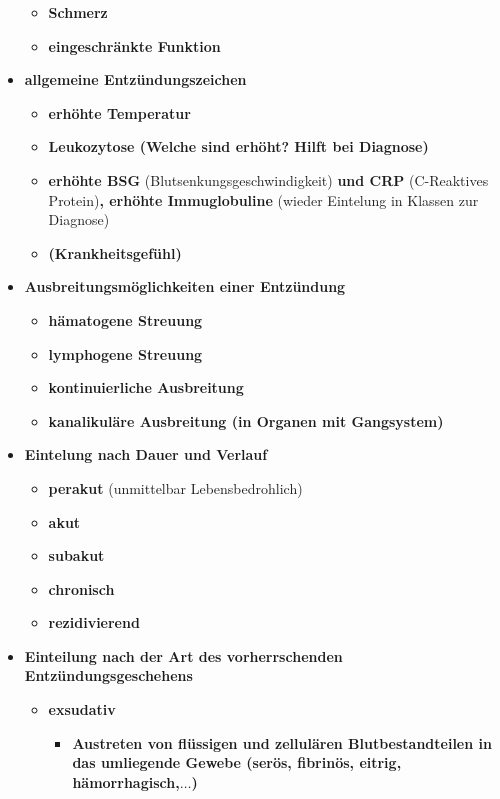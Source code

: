 \begin{itemize}
\begin{itemize}
				\item \textbf{Schmerz}
				\item \textbf{eingeschränkte Funktion}
			\end{itemize}
\pagebreak
		\item \textbf{allgemeine Entzündungszeichen}
			\begin{itemize}
				\item \textbf{erhöhte Temperatur}
				\item \textbf{Leukozytose (Welche sind erhöht? Hilft bei Diagnose)}
				\item \textbf{erhöhte BSG} (Blutsenkungsgeschwindigkeit) \textbf{und CRP} (C-Reaktives Protein)\textbf{, erhöhte Immuglobuline} (wieder Eintelung in Klassen zur Diagnose)
				\item \textbf{(Krankheitsgefühl)}
			\end{itemize}
		\item \textbf{Ausbreitungsmöglichkeiten einer Entzündung}
			\begin{itemize}
				\item \textbf{hämatogene Streuung}
				\item \textbf{lymphogene Streuung}
				\item \textbf{kontinuierliche Ausbreitung}
				\item \textbf{kanalikuläre Ausbreitung (in Organen mit Gangsystem)}
			\end{itemize}
		\item \textbf{Eintelung nach Dauer und Verlauf}
			\begin{itemize}
				\item \textbf{perakut} (unmittelbar Lebensbedrohlich)
				\item \textbf{akut}
				\item \textbf{subakut}
				\item \textbf{chronisch}
				\item \textbf{rezidivierend}
			\end{itemize}
		\item \textbf{Einteilung nach der Art des vorherrschenden Entzündungsgeschehens}
			\begin{itemize}
				\item \textbf{exsudativ	}
					\begin{itemize}
						\item \textbf{Austreten von flüssigen und zellulären Blutbestandteilen in das umliegende Gewebe (serös, fibrinös, eitrig, hämorrhagisch,$\dots$)}
					\end{itemize}

\end{itemize}
\end{itemize}
